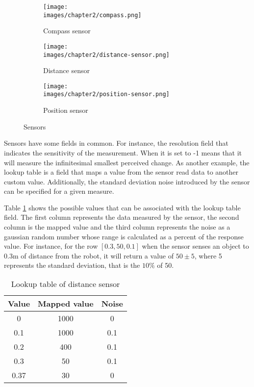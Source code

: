 \begin{figure}[h!]
  \centering
  \begin{subfigure}[b]{0.3\linewidth}
  	\texttt{[image: \\images/chapter2/compass.png]}
  	\caption{Compass sensor}
  	\label{fig:ch-2:compass}
  \end{subfigure}
  \vspace{0.00mm}
  \begin{subfigure}[b]{0.3\linewidth}
  	\texttt{[image: \\images/chapter2/distance-sensor.png]}
  	\caption{Distance sensor}
  	\label{fig:ch-2:distance-sensor}
  \end{subfigure}
  \vspace{0.00mm}
  \begin{subfigure}[b]{0.3\linewidth}
  	\texttt{[image: \\images/chapter2/position-sensor.png]}
  	\caption{Position sensor}
  	\label{fig:ch-2:position-sensor}
  \end{subfigure}
  \vspace{0.00mm}
  \caption{Sensors}
  \label{fig:ch-2:sensors}
\end{figure}

Sensors have some fields in common. For instance, the resolution field that indicates the sensitivity of the measurement. When it is set to -1 means that it will measure the infinitesimal smallest perceived change. As another example, the lookup table is a field that maps a value from the sensor read data to another custom value. Additionally, the standard deviation noise introduced by the sensor can be specified for a given measure. 

Table \ref{tab:ch-2:lookup} shows the possible values that can be associated with the lookup table field. The first column represents the data measured by the sensor, the second column is the mapped value and the third column represents the noise as a gaussian random number whose range is calculated as a percent of the response value\cite{cyberbotics}. For instance, for the row $[0.3, 50, 0.1]$ when the sensor senses an object to 0.3m of distance from the robot, it will return a value of $50 \pm 5$, where 5 represents the standard deviation, that is the $10\%$ of 50.
\begin{table}[h!]
\centering
 \begin{tabular}{c c c} 
 \hline
 Value & Mapped value & Noise \\ [0.5ex] 
 \hline\hline
 0 & 1000 & 0 \\ 
 \hline
0.1 & 1000 & 0.1 \\ 
 \hline
 0.2 & 400 & 0.1 \\ 
 \hline
 0.3 & 50 & 0.1 \\ 
 \hline
 0.37 & 30 & 0 \\ 
 \hline
\end{tabular}
\caption{Lookup table of distance sensor}
\label{tab:ch-2:lookup}
\end{table}

